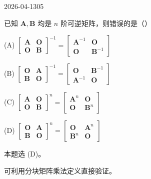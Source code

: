 \begin{mistake}{2026-04-13}{05}

\begin{problemcontent}
已知 \(\boldsymbol{A}, \boldsymbol{B}\) 均是 \(n\) 阶可逆矩阵，则错误的是（\quad）

(A) \(\begin{bmatrix} \boldsymbol{A} & \boldsymbol{O} \\ \boldsymbol{O} & \boldsymbol{B} \end{bmatrix}^{-1} = \begin{bmatrix} \boldsymbol{A}^{-1} & \boldsymbol{O} \\ \boldsymbol{O} & \boldsymbol{B}^{-1} \end{bmatrix}\)

(B) \(\begin{bmatrix} \boldsymbol{O} & \boldsymbol{A} \\ \boldsymbol{B} & \boldsymbol{O} \end{bmatrix}^{-1} = \begin{bmatrix} \boldsymbol{O} & \boldsymbol{B}^{-1} \\ \boldsymbol{A}^{-1} & \boldsymbol{O} \end{bmatrix}\)

(C) \(\begin{bmatrix} \boldsymbol{A} & \boldsymbol{O} \\ \boldsymbol{O} & \boldsymbol{B} \end{bmatrix}^{n} = \begin{bmatrix} \boldsymbol{A}^{n} & \boldsymbol{O} \\ \boldsymbol{O} & \boldsymbol{B}^{n} \end{bmatrix}\)

(D) \(\begin{bmatrix} \boldsymbol{O} & \boldsymbol{A} \\ \boldsymbol{B} & \boldsymbol{O} \end{bmatrix}^{n} = \begin{bmatrix} \boldsymbol{O} & \boldsymbol{A}^{n} \\ \boldsymbol{B}^{n} & \boldsymbol{O} \end{bmatrix}\)
\end{problemcontent}

\begin{solutioncontent}
本题选 (D)。

可利用分块矩阵乘法定义直接验证。


\end{solutioncontent}
\end{mistake}
